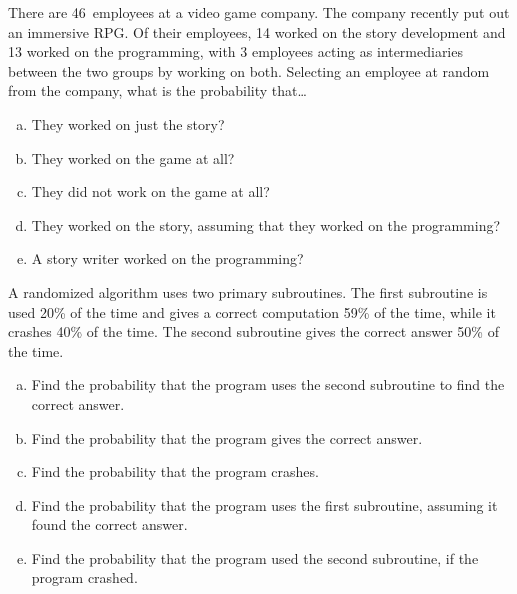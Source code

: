 \documentclass[11pt,letterpaper]{article}
\begin{document}
\homework{}

 There are 46~employees at a video game company. The company recently put out an immersive RPG. Of their employees, 14 worked on the story development and 13 worked on the programming, with 3 employees acting as intermediaries between the two groups by working on both. Selecting an employee at random from the company, what is the probability that\dots

\begin{enumerate}[(a)]
\item They worked on just the story?
\item They worked on the game at all?
\item They did not work on the game at all?
\item They worked on the story, assuming that they worked on the programming?
\item A story writer worked on the programming?
\end{enumerate}





\newpage





 A randomized algorithm uses two primary subroutines. The first subroutine is used 20\% of the time and gives a correct computation 59\% of the time, while it crashes 40\% of the time. The second subroutine gives the correct answer 50\% of the time. 

\begin{enumerate}[(a)]
\item Find the probability that the program uses the second subroutine to find the correct answer.
\item Find the probability that the program gives the correct answer.
\item Find the probability that the program crashes. 
\item Find the probability that the program uses the first subroutine, assuming it found the correct answer.
\item Find the probability that the program used the second subroutine, if the program crashed. 
\end{enumerate}





\newpage
\end{document}
